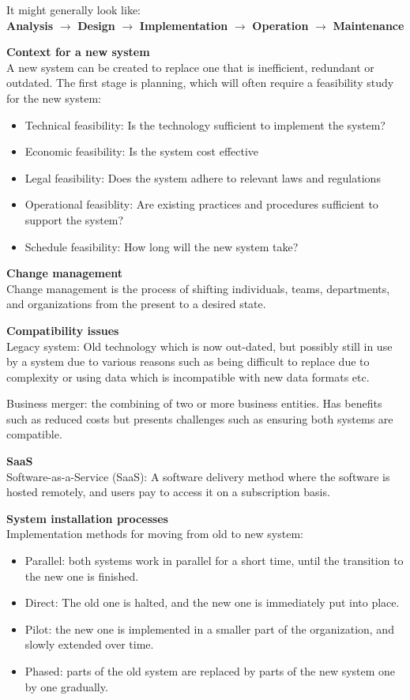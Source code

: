 \documentclass{article}
\begin{document}
It might generally look like: \\
\textbf{Analysis} $\rightarrow$ \textbf{Design} $\rightarrow$
\textbf{Implementation} $\rightarrow$ \textbf{Operation} $\rightarrow$
\textbf{Maintenance}

\textbf{Context for a new system} \\
A new system can be created to replace one that is inefficient, redundant or
outdated. The first stage is planning, which will often require a feasibility
study for the new system:
\begin{itemize}
    \item Technical feasibility: Is the technology sufficient to implement
        the system?
    \item Economic feasibility: Is the system cost effective
    \item Legal feasibility: Does the system adhere to relevant laws and
        regulations
    \item Operational feasiblity: Are existing practices and procedures
        sufficient to support the system?
    \item Schedule feasibility: How long will the new system take?
\end{itemize}

\textbf{Change management} \\
Change management is the process of shifting individuals, teams,
departments, and organizations from the present to a desired state.

\textbf{Compatibility issues} \\
Legacy system: Old technology which is now out-dated, but possibly still in
use by a system due to various reasons such as being difficult to replace due
to complexity or using data which is incompatible with new data formats etc.

Business merger: the combining of two or more business entities. Has benefits such
as reduced costs but presents challenges such as ensuring both systems are
compatible.

\textbf{SaaS} \\
Software-as-a-Service (SaaS): A software delivery method where the software is
hosted remotely, and users pay to access it on a subscription basis.

\textbf{System installation processes} \\
Implementation methods for moving from old to new system:
\begin{itemize}
    \item Parallel: both systems work in parallel for a short time, until the
        transition to the new one is finished.
    \item Direct: The old one is halted, and the new one is immediately put
        into place.
    \item Pilot: the new one is implemented in a smaller part of the
        organization, and slowly extended over time.
    \item Phased: parts of the old system are replaced by parts of the new
        system one by one gradually.
\end{itemize}
\end{document}

